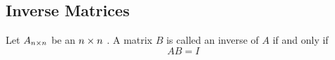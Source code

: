 \subsection{Inverse Matrices}\label{subsec:Inverse_Matrices}
\begin{definition}\label{def:Inverse_Matrix}
  Let $A_{n \times n}$ be an $n \times n$ .
  A matrix $B$ is called an inverse of $A$ if and only if
  \begin{equation}\label{eq:Inverse_Matrix}
    AB = I
  \end{equation}
\end{definition}


